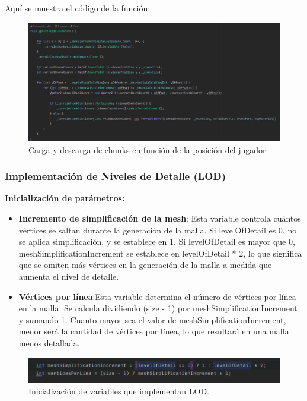 Aquí se muestra el código de la función:
\begin{figure}[h]
    \centering
    \includegraphics[width=1\textwidth]{img/codes/EndlessTerrain-updateVisibleChunks.png}
    \caption{Carga y descarga de chunks en función de la posición del jugador.}
\end{figure}

\subsubsection{Implementación de Niveles de Detalle (LOD)}

\textbf{Inicialización de parámetros:}

\begin{itemize}
    \item \textbf{Incremento de simplificación de la mesh}: Esta variable controla cuántos vértices se saltan durante la generación de la malla. Si levelOfDetail es 0, no se aplica simplificación, y se establece en 1. Si levelOfDetail es mayor que 0, meshSimplificationIncrement se establece en levelOfDetail * 2, lo que significa que se omiten más vértices en la generación de la malla a medida que aumenta el nivel de detalle.
    \item \textbf{Vértices por línea}:Esta variable determina el número de vértices por línea en la malla. Se calcula dividiendo (size - 1) por meshSimplificationIncrement y sumando 1. Cuanto mayor sea el valor de meshSimplificationIncrement, menor será la cantidad de vértices por línea, lo que resultará en una malla menos detallada.
\end{itemize}
\begin{figure}[h]
    \centering
    \includegraphics[width=1\textwidth]{img/codes/LOD-parametros.png}
    \caption{Inicialización de variables que implementan LOD.}
\end{figure}


